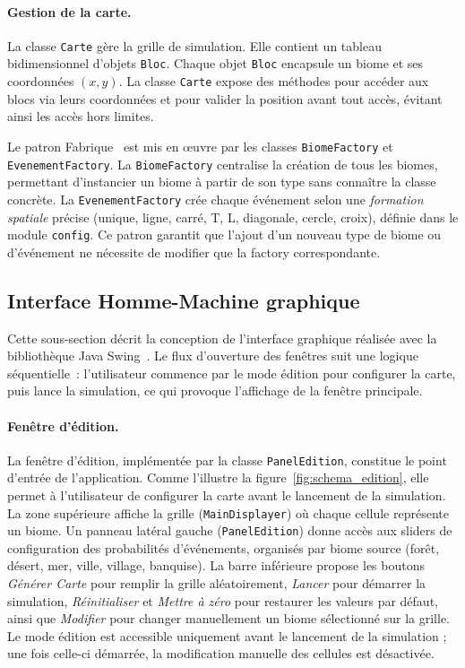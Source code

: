 \paragraph{Gestion de la carte.}
La classe \texttt{Carte} gère la grille de simulation. Elle contient un tableau
bidimensionnel d'objets \texttt{Bloc}. Chaque objet \texttt{Bloc} encapsule un
biome et ses coordonnées $(x, y)$. La classe \texttt{Carte} expose des méthodes
pour accéder aux blocs via leurs coordonnées et pour valider la position avant
tout accès, évitant ainsi les accès hors limites.

Le patron Fabrique~\cite{gamma1994design,freeman2004head} est mis en œuvre par les classes
\texttt{BiomeFactory} et \texttt{EvenementFactory}. La \texttt{BiomeFactory}
centralise la création de tous les biomes, permettant d'instancier un biome à
partir de son type sans connaître la classe concrète. La \texttt{EvenementFactory}
crée chaque événement selon une \emph{formation spatiale} précise (unique,
ligne, carré, T, L, diagonale, cercle, croix), définie dans le module
\texttt{config}. Ce patron garantit que l'ajout d'un nouveau type de biome ou
d'événement ne nécessite de modifier que la factory correspondante.

\subsection{Interface Homme-Machine graphique}
\label{subsec:ihm}

Cette sous-section décrit la conception de l'interface graphique réalisée avec
la bibliothèque Java Swing~\cite{oracle_swing}. Le flux d'ouverture des fenêtres
suit une logique séquentielle~: l'utilisateur commence par le mode édition pour
configurer la carte, puis lance la simulation, ce qui provoque l'affichage de la
fenêtre principale.

\paragraph{Fenêtre d'édition.}
La fenêtre d'édition, implémentée par la classe \texttt{PanelEdition}, constitue le
point d'entrée de l'application. Comme l'illustre la figure~\ref{fig:schema_edition},
elle permet à l'utilisateur de configurer la carte avant le lancement de la simulation. La zone supérieure affiche la grille
(\texttt{MainDisplayer}) où chaque cellule représente un biome. Un panneau
latéral gauche (\texttt{PanelEdition}) donne accès aux sliders de configuration des
probabilités d'événements, organisés par biome source (forêt, désert, mer, ville,
village, banquise). La barre inférieure propose les boutons \textit{Générer Carte}
pour remplir la grille aléatoirement, \textit{Lancer} pour démarrer la
simulation, \textit{Réinitialiser} et \textit{Mettre à zéro} pour restaurer les
valeurs par défaut, ainsi que \textit{Modifier} pour changer manuellement un biome
sélectionné sur la grille. Le mode édition est accessible uniquement avant le
lancement de la simulation ; une fois celle-ci démarrée, la modification
manuelle des cellules est désactivée.

